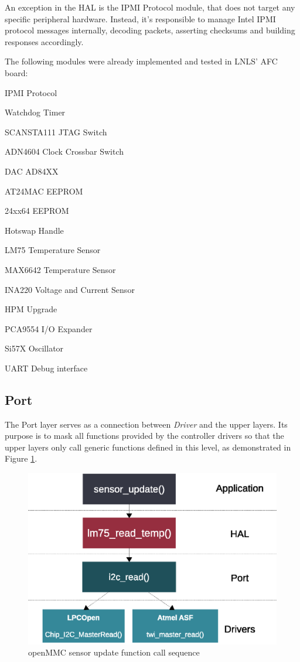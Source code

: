 \documentclass[a4paper,
              ]{jacow}
\begin{document}
An exception in the HAL is the IPMI Protocol module, that does not target any specific peripheral hardware. Instead, it's responsible to manage Intel IPMI protocol messages internally, decoding packets, asserting checksums and building responses accordingly.

The following modules were already implemented and tested in LNLS' AFC board:
\begin{Itemize}

\item IPMI Protocol
\item Watchdog Timer
\item SCANSTA111 JTAG Switch
\item ADN4604 Clock Crossbar Switch
\item DAC AD84XX
\item AT24MAC EEPROM
\item 24xx64 EEPROM
\item Hotswap Handle
\item LM75 Temperature Sensor
\item MAX6642 Temperature Sensor
\item INA220 Voltage and Current Sensor
\item HPM Upgrade
\item PCA9554 I/O Expander
\item Si57X Oscillator
\item UART Debug interface

\end{Itemize}

\subsection{Port}
The Port layer serves as a connection between \emph{Driver} and the upper layers.
Its purpose is to mask all functions provided by the controller drivers so that the upper layers only call generic functions defined in this level, as demonstrated in Figure \ref{fig:port-example}.

\begin{figure}[!htb]
\centering
\includegraphics[scale=0.6]{port-example-dark.eps}
\caption{openMMC sensor update function call sequence}
\label{fig:port-example}
\end{figure}
\end{document}

